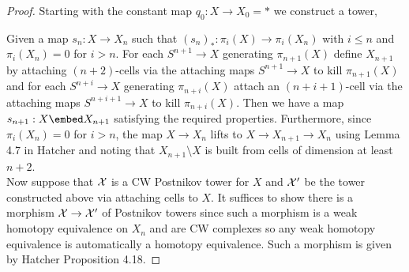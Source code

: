 \documentclass[12pt]{extarticle}
\begin{document}
\begin{proof}
Starting with the constant map $q_0 : X \to X_0 = *$ we construct a tower,
\begin{center}
\end{center}
Given a map $s_n : X \to X_n$ such that $(s_n)_* : \pi_i(X) \to \pi_i(X_n)$ with $i \le n$ and $\pi_i(X_n) = 0$ for $i > n$. For each $S^{n+1} \to X$ generating $\pi_{n+1}(X)$ define $X_{n+1}$ by attaching $(n+2)$-cells via the attaching maps $S^{n+1} \to X$ to kill $\pi_{n+1}(X)$ and for each $S^{n+i} \to X$ generating $\pi_{n+i}(X)$ attach an $(n+i+1)$-cell via the attaching maps $S^{n+i+1} \to X$ to kill $\pi_{n+i}(X)$. Then we have a map $s_{n+1} : X \embed X_{n+1}$ satisfying the required properties. Furthermore, since $\pi_{i}(X_{n}) = 0$ for $i > n$, the map $X \to X_n$ lifts to $X \to X_{n+1} \to X_n$ using Lemma 4.7 in Hatcher and noting that $X_{n+1} \setminus X$ is built from cells of dimension at least $n+2$.
\bigskip\\
Now suppose that $\mathcal{X}$ is a CW Postnikov tower for $X$ and $\mathcal{X}'$ be the tower constructed above via attaching cells to $X$. It suffices to show there is a morphism $\mathcal{X} \to \mathcal{X}'$ of Postnikov towers since such a morphism is a weak homotopy equivalence on $X_n$ and are CW complexes so any weak homotopy equivalence is automatically a homotopy equivalence. Such a morphism is given by Hatcher Proposition 4.18.
\end{proof}
\end{document}
